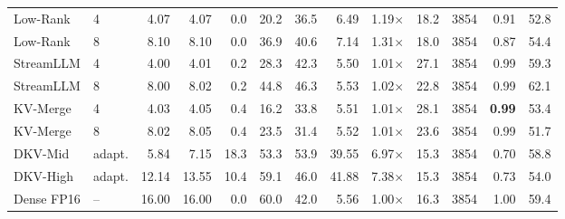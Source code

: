 \begin{tabular}{@{}ll rrr rr rrrr rr@{}}
Low-Rank & 4 & 4.07 & 4.07 & 0.0 & 20.2 & 36.5 & 6.49 & 1.19$\times$ & 18.2 & 3854 & 0.91 & 52.8 \\
Low-Rank & 8 & 8.10 & 8.10 & 0.0 & 36.9 & 40.6 & 7.14 & 1.31$\times$ & 18.0 & 3854 & 0.87 & 54.4 \\
StreamLLM & 4 & 4.00 & 4.01 & 0.2 & 28.3 & 42.3 & 5.50 & 1.01$\times$ & 27.1 & 3854 & 0.99 & 59.3 \\
StreamLLM & 8 & 8.00 & 8.02 & 0.2 & 44.8 & 46.3 & 5.53 & 1.02$\times$ & 22.8 & 3854 & 0.99 & 62.1 \\
KV-Merge & 4 & 4.03 & 4.05 & 0.4 & 16.2 & 33.8 & 5.51 & 1.01$\times$ & 28.1 & 3854 & \textbf{0.99} & 53.4 \\
KV-Merge & 8 & 8.02 & 8.05 & 0.4 & 23.5 & 31.4 & 5.52 & 1.01$\times$ & 23.6 & 3854 & 0.99 & 51.7 \\
DKV-Mid & adapt. & 5.84 & 7.15 & 18.3 & 53.3 & 53.9 & 39.55 & 6.97$\times$ & 15.3 & 3854 & 0.70 & 58.8 \\
DKV-High & adapt. & 12.14 & 13.55 & 10.4 & 59.1 & 46.0 & 41.88 & 7.38$\times$ & 15.3 & 3854 & 0.73 & 54.0 \\
Dense FP16 & -- & 16.00 & 16.00 & 0.0 & 60.0 & 42.0 & 5.56 & 1.00$\times$ & 16.3 & 3854 & 1.00 & 59.4 \\
\bottomrule
\end{tabular}
